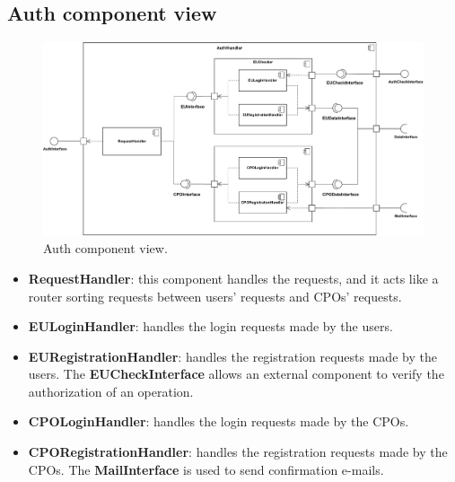 \subsection{Auth component view}
\begin{figure}[H]
    \centering
    \includegraphics[width=\textwidth]{images/AuthComponent.pdf}
    \caption{Auth component view.}
    \label{fig:auth_comp}
\end{figure}
\begin{itemize}
    \item \textbf{RequestHandler}: this component handles the requests, and it acts like a router sorting requests between users' requests and CPOs' requests.
    \item \textbf{EULoginHandler}: handles the login requests made by the users.
    \item \textbf{EURegistrationHandler}: handles the registration requests made by the users. The \textbf{EUCheckInterface} allows an external component to verify the authorization of an operation.
    \item \textbf{CPOLoginHandler}: handles the login requests made by the CPOs.
    \item \textbf{CPORegistrationHandler}: handles the registration requests made by the CPOs. The \textbf{MailInterface} is used to send confirmation e-mails.
\end{itemize}
